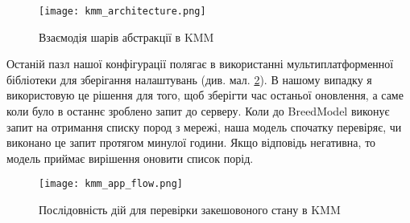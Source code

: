 \begin{figure}
    \begin{center}
        \texttt{[image: kmm\_architecture.png]}
        \caption{Взаємодія шарів абстракції в KMM}
        \label{fig:kmm_architecture}
    \end{center}
\end{figure}

Останій пазл нашої конфігурації полягає в використанні мультиплатформенної бібліотеки для зберігання налаштувань (див. мал. \ref{fig:kmm_app_flow}).
В нашому випадку я використовую це рішення для того, щоб зберігти час останьої оновлення, а саме коли було в останнє зроблено запит до серверу.
Коли до BreedModel виконує запит на отримання списку пород з мережі, наша модель спочатку перевіряє, чи виконано це запит протягом минулої години.
Якщо відповідь негативна, то модель приймає вирішення оновити список порід.

\begin{figure}
    \begin{center}
        \texttt{[image: kmm\_app\_flow.png]}
        \caption{Послідовність дій для перевірки закешовоного стану в KMM}
        \label{fig:kmm_app_flow}
    \end{center}
\end{figure}
